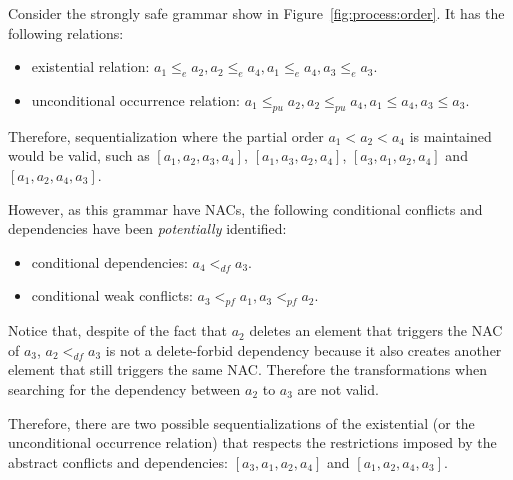 \begin{example} Consider the strongly safe grammar show in Figure~\ref{fig:process:order}. It has the following relations:

\begin{itemize}
  \item existential relation: $a_1 \leq_e a_2, a_2 \leq_e a_4, a_1 \leq_e a_4, a_3 \leq_e a_3$.
  \item unconditional occurrence relation: $a_1 \leq_{pu} a_2, a_2 \leq_{pu} a_4, a_1 \leq a_4, a_3 \leq a_3$.
\end{itemize}

  Therefore, sequentialization where the partial order $a_1 < a_2 < a_4$ is maintained would be valid, such as $[a_1, a_2, a_3, a_4]$, $[a_1,a_3,a_2,a_4]$, $[a_3, a_1, a_2, a_4]$ and $[a_1,a_2,a_4,a_3]$.

  However, as this grammar have NACs, the following conditional conflicts and dependencies have been \textit{potentially} identified:
\begin{itemize}
  \item conditional dependencies: $a_4 <_{df} a_3$.
  \item conditional weak conflicts: $a_3 <_{pf} a_1, a_3 <_{pf} a_2$.
\end{itemize}

  Notice that, despite of the fact that $a_2$ deletes an element that triggers the NAC of $a_3$, $a_2 <_{df} a_3$ is not a delete-forbid dependency because it also creates another element that still triggers the same NAC. Therefore the transformations when searching for the dependency between $a_2$ to $a_3$ are not valid.

  Therefore, there are two possible sequentializations of the existential (or the unconditional occurrence relation) that respects the restrictions imposed by the abstract conflicts and dependencies: $[a_3, a_1, a_2, a_4]$ and $[a_1,a_2,a_4,a_3]$.


\end{example}
